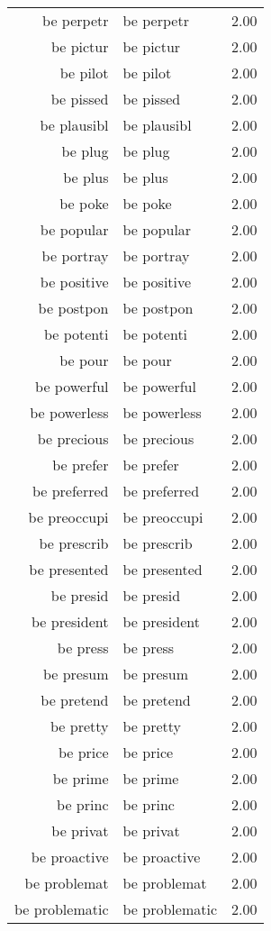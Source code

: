\begin{table}[ht]
\begin{tabular}{rlr}
  be perpetr & be perpetr & 2.00 \\ 
  be pictur & be pictur & 2.00 \\ 
  be pilot & be pilot & 2.00 \\ 
  be pissed & be pissed & 2.00 \\ 
  be plausibl & be plausibl & 2.00 \\ 
  be plug & be plug & 2.00 \\ 
  be plus & be plus & 2.00 \\ 
  be poke & be poke & 2.00 \\ 
  be popular & be popular & 2.00 \\ 
  be portray & be portray & 2.00 \\ 
  be positive & be positive & 2.00 \\ 
  be postpon & be postpon & 2.00 \\ 
  be potenti & be potenti & 2.00 \\ 
  be pour & be pour & 2.00 \\ 
  be powerful & be powerful & 2.00 \\ 
  be powerless & be powerless & 2.00 \\ 
  be precious & be precious & 2.00 \\ 
  be prefer & be prefer & 2.00 \\ 
  be preferred & be preferred & 2.00 \\ 
  be preoccupi & be preoccupi & 2.00 \\ 
  be prescrib & be prescrib & 2.00 \\ 
  be presented & be presented & 2.00 \\ 
  be presid & be presid & 2.00 \\ 
  be president & be president & 2.00 \\ 
  be press & be press & 2.00 \\ 
  be presum & be presum & 2.00 \\ 
  be pretend & be pretend & 2.00 \\ 
  be pretty & be pretty & 2.00 \\ 
  be price & be price & 2.00 \\ 
  be prime & be prime & 2.00 \\ 
  be princ & be princ & 2.00 \\ 
  be privat & be privat & 2.00 \\ 
  be proactive & be proactive & 2.00 \\ 
  be problemat & be problemat & 2.00 \\ 
  be problematic & be problematic & 2.00 \\ 

\end{tabular}
\end{table}
